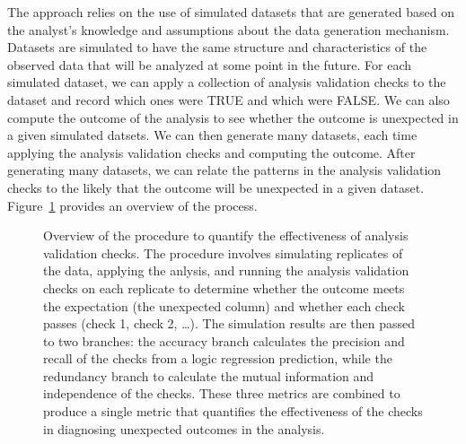 \documentclass[
  12pt,
]{interact}
\begin{document}
The approach relies on the use of simulated datasets that are generated
based on the analyst's knowledge and assumptions about the data
generation mechanism. Datasets are simulated to have the same structure
and characteristics of the observed data that will be analyzed at some
point in the future. For each simulated dataset, we can apply a
collection of analysis validation checks to the dataset and record which
ones were TRUE and which were FALSE. We can also compute the outcome of
the analysis to see whether the outcome is unexpected in a given
simulated datsets. We can then generate many datasets, each time
applying the analysis validation checks and computing the outcome. After
generating many datasets, we can relate the patterns in the analysis
validation checks to the likely that the outcome will be unexpected in a
given dataset. Figure~\ref{fig-metric-calc} provides an overview of the
process.

\label{cell-fig-metric-calc}
\begin{figure}[H]


\caption{\label{fig-metric-calc}Overview of the procedure to quantify
the effectiveness of analysis validation checks. The procedure involves
simulating replicates of the data, applying the anlysis, and running the
analysis validation checks on each replicate to determine whether the
outcome meets the expectation (the unexpected column) and whether each
check passes (check 1, check 2, \ldots). The simulation results are then
passed to two branches: the accuracy branch calculates the precision and
recall of the checks from a logic regression prediction, while the
redundancy branch to calculate the mutual information and independence
of the checks. These three metrics are combined to produce a single
metric that quantifies the effectiveness of the checks in diagnosing
unexpected outcomes in the analysis.}

\end{figure}%
\end{document}
